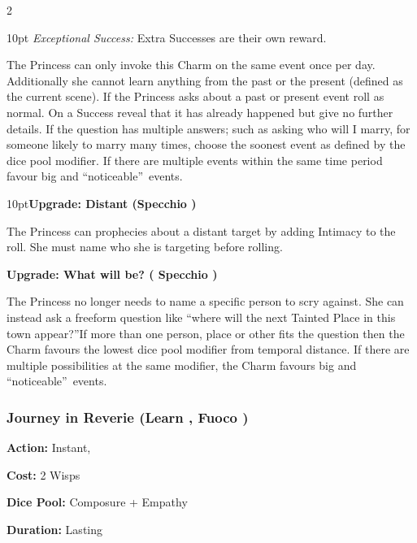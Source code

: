 \begin{multicols}{2}
\begin{myindentpar}{10pt}
    \emph{Exceptional Success:} Extra Successes are their own reward.\end{myindentpar}

The Princess can only invoke this Charm on the same event once per day. Additionally she cannot learn anything from the past or the present (defined as the current scene). If the Princess asks about a past or present event roll as normal. On a Success reveal that it has already happened but give no further details. If the question has multiple answers; such as asking who will I marry, for someone likely to marry many times, choose the soonest event as defined by the dice pool modifier. If there are multiple events within the same time period favour big and \textquotedblleft noticeable\textquotedblright\, events.

\begin{myindentpar}{10pt}\textbf{Upgrade: Distant (Specchio \textbullet\textbullet\textbullet\textbullet)}

The Princess can prophecies about a distant target by adding Intimacy to the roll. She must name who she is targeting before rolling.

\textbf{Upgrade: What will be? ( Specchio \textbullet\textbullet\textbullet\textbullet\textbullet)}

The Princess no longer needs to name a specific person to scry against. She can instead ask a freeform question like \textquotedblleft where will the next Tainted Place in this town appear?\textquotedblright If more than one person, place or other fits the question then the Charm favours the lowest dice pool modifier from temporal distance. If there are multiple possibilities at the same modifier, the Charm favours big and \textquotedblleft noticeable\textquotedblright\, events. \end{myindentpar}

\subsubsection*{Journey in Reverie (Learn \textbullet\textbullet\textbullet\textbullet, Fuoco \textbullet\textbullet\textbullet)}

\noindent \textbf{Action:} Instant, 

\noindent \textbf{Cost:} 2 Wisps

\noindent \textbf{Dice Pool:} Composure + Empathy

\noindent \textbf{Duration:} Lasting \\


\end{multicols}
